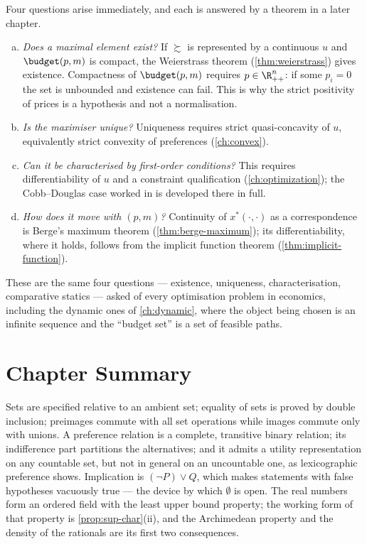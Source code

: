 Four questions arise immediately, and each is answered by a theorem in a later
chapter.

\begin{enumerate}[(a)]
	\item \emph{Does a maximal element exist?} If $\succsim$ is represented by a
	      continuous $u$ and $\budget(p,m)$ is compact, the Weierstrass theorem
	      (\autoref{thm:weierstrass}) gives existence. Compactness of $\budget(p,m)$
	      requires $p\in\R^n_{++}$: if some $p_i=0$ the set is unbounded and existence
	      can fail. This is why the strict positivity of prices is a hypothesis and
	      not a normalisation.
	\item \emph{Is the maximiser unique?} Uniqueness requires strict quasi-concavity
	      of $u$, equivalently strict convexity of preferences
	      (\autoref{ch:convex}).
	\item \emph{Can it be characterised by first-order conditions?} This requires
	      differentiability of $u$ and a constraint qualification
	      (\autoref{ch:optimization}); the Cobb--Douglas case worked in
	      \autocite[slides 21--32]{fukuda2026optimization} is developed there in full.
	\item \emph{How does it move with $(p,m)$?} Continuity of $x^\ast(\cdot,\cdot)$
	      as a correspondence is Berge's maximum theorem
	      (\autoref{thm:berge-maximum}); its differentiability, where it holds,
	      follows from the implicit function theorem
	      (\autoref{thm:implicit-function}).
\end{enumerate}

These are the same four questions ---
existence, uniqueness, characterisation, comparative statics --- asked of every
optimisation problem in economics, including the dynamic ones of
\autoref{ch:dynamic}, where the object being chosen is an infinite sequence and
the ``budget set'' is a set of feasible paths.

\section{Chapter Summary}\label{sec:sets-summary}

Sets are specified relative to an ambient set; equality of sets is proved by
double inclusion; preimages commute with all set operations while images commute
only with unions. A preference relation is a complete, transitive binary
relation; its indifference part partitions the alternatives; and it admits a
utility representation on any countable set, but not in general on an uncountable
one, as lexicographic preference shows. Implication is $(\neg P)\vee Q$, which
makes statements with false hypotheses vacuously true --- the device by which
$\emptyset$ is open. The real numbers form an ordered field with the least upper
bound property; the working form of that property is
\autoref{prop:sup-char}(ii), and the Archimedean property and the density of the
rationals are its first two consequences.

